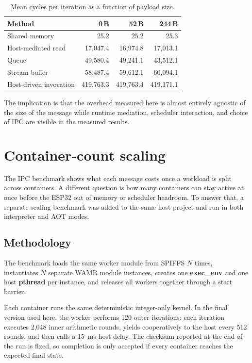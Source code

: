 \documentclass[12pt, a4paper]{report}
\begin{document}
\begin{table}[htbp]
\centering
\small
\begin{tabular}{@{}lrrr@{}}
\toprule
\textbf{Method} & \textbf{0\,B} & \textbf{52\,B} & \textbf{244\,B} \\
\midrule
Shared memory   & 25.2       & 25.2       & 25.3 \\
Host-mediated read     & 17{,}047.4 & 16{,}974.8 & 17{,}013.1 \\
Queue                  & 49{,}580.4 & 49{,}241.1 & 43{,}512.1 \\
Stream buffer          & 58{,}487.4 & 59{,}612.1 & 60{,}094.1 \\
Host-driven invocation & 419{,}763.3 & 419{,}763.4 & 419{,}171.1 \\
\bottomrule
\end{tabular}
\caption{Mean cycles per iteration as a function of payload size. }      
\label{tab:ipc-payload}
\end{table}

The implication is that the overhead measured here is almost entirely agnostic of the size of the message while runtime mediation, scheduler interaction, and choice of IPC are visible in the measured results.

\section{Container-count scaling}
\label{sec:containerization-scaling}

The IPC benchmark shows what each message costs once a workload is split across containers. A different question is how many containers can stay active at once before the ESP32 out of memory or scheduler headroom. To answer that, a separate scaling benchmark was added to the same host project and run in both interpreter and AOT modes.

\subsection{Methodology}
\label{subsec:containerization-scaling-method}

The benchmark loads the same worker module from SPIFFS $N$ times, instantiates $N$ separate WAMR module instances, creates one \textbf{exec\_env} and one host \textbf{pthread} per instance, and releases all workers together through a start barrier. 

Each container runs the same deterministic integer-only kernel. In the final version used here, the worker performs 120 outer iterations; each iteration executes 2{,}048 inner arithmetic rounds, yields cooperatively to the host every 512 rounds, and then calls a 15~ms host delay. The checksum reported at the end of the run is fixed, so completion is only accepted if every container reaches the expected final state.
\end{document}
